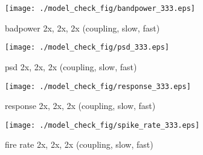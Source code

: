 \documentclass[11pt]{article}
\begin{document}
\begin{figure}[htbp]
\centering
\texttt{[image: ./model\_check\_fig/bandpower\_333.eps]}
\caption{badpower 2x, 2x, 2x (coupling, slow, fast)}
\end{figure}


\begin{figure}[htbp]
\begin{center}
\texttt{[image: ./model\_check\_fig/psd\_333.eps]}
\caption{psd 2x, 2x, 2x (coupling, slow, fast)}
\end{center}
\end{figure}

\begin{figure}[htbp]
\begin{center}
\texttt{[image: ./model\_check\_fig/response\_333.eps]}
\caption{response 2x, 2x, 2x (coupling, slow, fast)}
\end{center}
\end{figure}

\begin{figure}[htbp]
\begin{center}
\texttt{[image: ./model\_check\_fig/spike\_rate\_333.eps]}
\caption{fire rate 2x, 2x, 2x (coupling, slow, fast)}
\end{center}
\end{figure}
\end{document}
